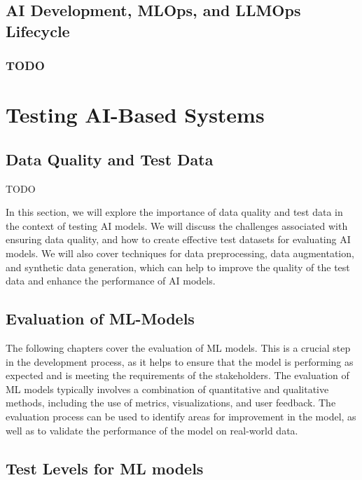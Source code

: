 \documentclass[
  letterpaper,
  DIV=11,
  numbers=noendperiod,
  oneside]{scrreprt}
\begin{document}
\begin{tcolorbox}
\chapter{AI Development, MLOps, and LLMOps
Lifecycle}\label{ai-development-mlops-and-llmops-lifecycle}

\section{TODO}\label{todo}

\part{Testing AI-Based Systems}

\chapter{Data Quality and Test Data}\label{data-quality-and-test-data}

TODO

In this section, we will explore the importance of data quality and test
data in the context of testing AI models. We will discuss the challenges
associated with ensuring data quality, and how to create effective test
datasets for evaluating AI models. We will also cover techniques for
data preprocessing, data augmentation, and synthetic data generation,
which can help to improve the quality of the test data and enhance the
performance of AI models.

\chapter{Evaluation of ML-Models}\label{evaluation-of-ml-models}

The following chapters cover the evaluation of ML models. This is a
crucial step in the development process, as it helps to ensure that the
model is performing as expected and is meeting the requirements of the
stakeholders. The evaluation of ML models typically involves a
combination of quantitative and qualitative methods, including the use
of metrics, visualizations, and user feedback. The evaluation process
can be used to identify areas for improvement in the model, as well as
to validate the performance of the model on real-world data.

\chapter{Test Levels for ML models}\label{test-levels-for-ml-models}


\end{tcolorbox}
\end{document}
